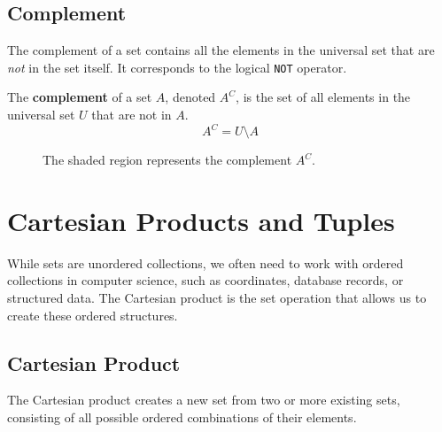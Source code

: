 \subsection*{Complement}
The complement of a set contains all the elements in the universal set that are \textit{not} in the set itself. It corresponds to the logical \texttt{NOT} operator.

\begin{definition}[Complement]
    The \textbf{complement} of a set $A$, denoted $A^C$, is the set of all elements in the universal set $U$ that are not in $A$.
    \[ A^C = U \setminus A \]
\end{definition}

\begin{figure}[htbp]
    \centering
    \caption{The shaded region represents the complement $A^C$.}
    \label{fig:complement_custom}
\end{figure}

\section{Cartesian Products and Tuples}
While sets are unordered collections, we often need to work with ordered collections in computer science, such as coordinates, database records, or structured data. The Cartesian product is the set operation that allows us to create these ordered structures.

\subsection*{Cartesian Product}
The Cartesian product creates a new set from two or more existing sets, consisting of all possible ordered combinations of their elements.

